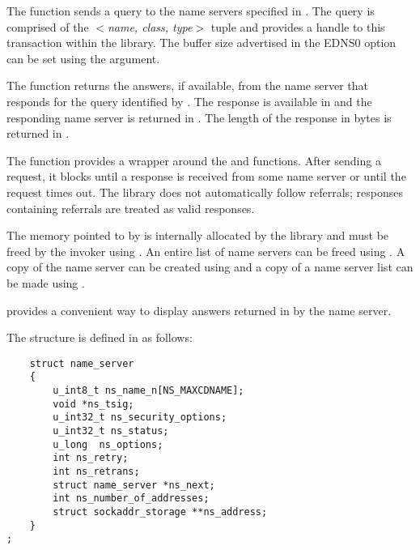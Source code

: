 The  function sends a query to the name servers specified
in .  The query is comprised of the $<${\it name, class, type}$>$
tuple and  provides a handle to this transaction within the
 library.  The buffer size advertised in the EDNS0 option can be
set using the  argument.

The  function returns the answers, if available, from the
name server that responds for the query identified by .
The response is available in  and the responding name server is
returned in .  The length of the response in bytes is returned
in .

The  function provides a wrapper around the  and
 functions.  After sending a request, it blocks until
a response is received from some name server or until the request times out.
The  library does not automatically follow referrals; responses
containing referrals are treated as valid responses.

The memory pointed to by  is internally allocated by the
 library and must be freed by the invoker using
.  An entire list of name servers can be freed using
.  A copy of the name server can be created using
 and a copy of a name server list can be made using
.

 provides a convenient way to display answers returned
in  by the name server.

The  structure is defined in  as follows:

\begin{verbatim}
    struct name_server
    {
        u_int8_t ns_name_n[NS_MAXCDNAME];
        void *ns_tsig;
        u_int32_t ns_security_options;
        u_int32_t ns_status;
        u_long  ns_options;
        int ns_retry;
        int ns_retrans;
        struct name_server *ns_next;
        int ns_number_of_addresses;
        struct sockaddr_storage **ns_address;
    }
;\end{verbatim}

